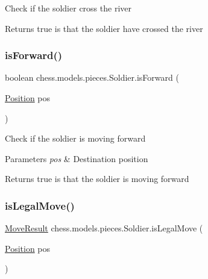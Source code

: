 Check if the soldier cross the river

\begin{DoxyReturn}{Returns}
true is that the soldier have crossed the river 
\end{DoxyReturn}
\mbox{\label{classchess_1_1models_1_1pieces_1_1_soldier_a3be305544d8e788663b6c394d334f596}} 
\subsubsection{\texorpdfstring{is\+Forward()}{isForward()}}
{\footnotesize\ttfamily boolean chess.\+models.\+pieces.\+Soldier.\+is\+Forward (\begin{DoxyParamCaption}\item[{\mbox{\hyperlink{classchess_1_1models_1_1_position}{Position}}}]{pos }\end{DoxyParamCaption})}

Check if the soldier is moving forward


\begin{DoxyParams}{Parameters}
{\em pos} & Destination position \\
\hline
\end{DoxyParams}
\begin{DoxyReturn}{Returns}
true is that the soldier is moving forward 
\end{DoxyReturn}
\mbox{\label{classchess_1_1models_1_1pieces_1_1_soldier_a5a0cc5ebe1f0a4b2b68b9359f5bad0c5}} 
\subsubsection{\texorpdfstring{is\+Legal\+Move()}{isLegalMove()}}
{\footnotesize\ttfamily \mbox{\hyperlink{enumchess_1_1models_1_1enums_1_1_move_result}{Move\+Result}} chess.\+models.\+pieces.\+Soldier.\+is\+Legal\+Move (\begin{DoxyParamCaption}\item[{\mbox{\hyperlink{classchess_1_1models_1_1_position}{Position}}}]{pos }\end{DoxyParamCaption})}

